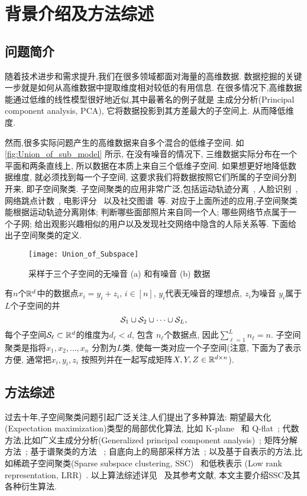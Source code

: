 \chapter{背景介绍及方法综述}\label{chp:intro}
\section{问题简介}
随着技术进步和需求提升,我们在很多领域都面对海量的高维数据. 
数据挖掘的关键一步就是如何从高维数据中提取维度相对较低的有用信息.
在很多情况下,高维数据能通过低维的线性模型很好地近似,其中最著名的例子就是
主成分分析(Principal component analysis, PCA), 它将数据投影到其方差最大的子空间上.
从而降低维度.

然而,很多实际问题产生的高维数据来自多个混合的低维子空间.
如\autoref{fig:Union_of_sub_model} 所示, 在没有噪音的情况下,
三维数据实际分布在一个平面和两条直线上,
所以数据在本质上来自三个低维子空间.
如果想更好地降低数据维度, 就必须找到每一个子空间,
这要求我们将数据按照它们所属的子空间分割开来, 即子空间聚类.
子空间聚类的应用非常广泛,包括运动轨迹分离~\cite{costeira1998multibody},
人脸识别~\cite{basri2003lambertian},网络跳点计数~\cite{eriksson2011high},
电影评分~\cite{zhang2012guess} 以及社交图谱~\cite{chen2014clustering}等.
对应于上面所述的应用,子空间聚类能根据运动轨迹分离刚体;
判断哪些面部照片来自同一个人; 哪些网络节点属于一个子网;
给出观影兴趣相似的用户以及发现社交网络中隐含的人际关系等.
下面给出子空间聚类的定义.
\begin{figure}[tb]
  \centering
  \texttt{[image: Union\_of\_Subspace]}
  \caption{采样于三个子空间的无噪音 (a) 和有噪音 (b) 数据}\label{fig:Union_of_sub_model}
\end{figure}
\begin{definition}\label{def:sc}
  有\(n\)个\(\mathbb{R}^d\)中的数据点\(x_i = y_i+z_i, \, i \in [n]\),
  \(y_i\)代表无噪音的理想点, \(z_i\)为噪音
  \(y_i\)属于\(L\)个子空间的并
  \[\mathcal{S}_1 \cup \mathcal{S}_2 \cup\cdots\cup \mathcal{S}_L,\]
  每个子空间\(\mathcal{S}_\ell \subset \mathbb{R}^d\)的维度为\(d_{\ell} < d\),
  包含 \(n_{\ell}\)个数据点, 因此\(\sum_{\ell=1}^L n_\ell=n\). 
  子空间聚类是指将\(x_1, x_2, \ldots, x_n\) 分割为\(L\)类,
  使每一类对应一个子空间(注意, 下面为了表示方便, 通常把\(x_i, y_i, z_i\)
  按照列并在一起写成矩阵\(X, Y, Z\in \mathbb{R}^{d\times n}\)).
\end{definition}
\section{方法综述}
过去十年,子空间聚类问题引起广泛关注,人们提出了多种算法:
期望最大化(Expectation maximization)类型的局部优化算法,
比如 K-plane~\cite{bradley2000k} 和 Q-flat~\cite{tseng2000nearest};
代数方法,比如广义主成分分析(Generalized principal component analysis)~\cite{vidal2005generalized};
矩阵分解方法~\cite{costeira1995multi,costeira1998multibody}; 基于谱聚类的方法
~\cite{chen2009spectral,lauer2009spectral}; 自底向上的局部采样方法~\cite{rao2008motion,yan2006general};
以及基于自表示的方法,比如稀疏子空间聚类(Sparse subspace clustering, SSC)~\cite{elhamifar2009sparse,elhamifar2013sparse}
和低秩表示 (Low rank representation, LRR)~\cite{liu2010robust,liu2013robust}.
以上算法综述详见~\cite{vidal2010tutorial} 及其参考文献,
本文主要介绍SSC及其各种衍生算法.

